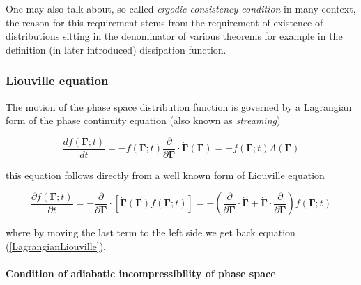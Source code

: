 \documentclass[a4paper,12pt]{article}
\begin{document}
One may also talk about, so called \textit{ergodic consistency condition} in many context, the reason for this requirement stems from the requirement of existence of distributions sitting in the denominator of various theorems for example in the definition (in later introduced) dissipation function.

\subsubsection{Liouville equation}



The motion of the phase space distribution function is governed by a Lagrangian form of the phase continuity equation (also known as \textit{streaming})

\begin{equation}
\label{LagrangianLiouville}
  \frac{df(\bm{\Gamma};t)}{dt}=-f(\bm{\Gamma};t)\frac{\partial}{\partial \bm{\Gamma}} \cdot \dot{\bm{\Gamma}}(\bm{\Gamma}) = -f(\bm{\Gamma};t)\Lambda(\bm{\Gamma})
\end{equation}

this equation follows directly from a well known form of Liouville equation

\begin{equation}
    \frac{\partial f(\bm{\Gamma};t) }{\partial t}
    = -\frac{\partial}{\partial \bm{\Gamma}} \cdot [\dot{\bm{\Gamma}}(\bm{\Gamma}) f(\bm{\Gamma};t)]
     = -(\frac{\partial}{\partial \bm{\Gamma}} \cdot \dot{\bm{\Gamma}} + \dot{\bm{\Gamma}} \cdot \frac{\partial}{\partial \bm{\Gamma}}) f(\bm{\Gamma};t)
\end{equation}

where by moving the last term to the left side we get back equation (\ref{LagrangianLiouville}).

\noindent\makebox[\linewidth]{\rule{\textwidth}{1pt}} 
\paragraph{Condition of adiabatic incompressibility of phase space}
\end{document}
